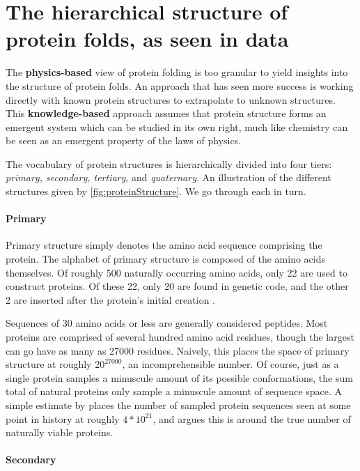 \documentclass{article}
\begin{document}
\section{The hierarchical structure of protein folds, as seen in data}
The \textbf{physics-based} view of protein folding is too granular to yield insights into the structure of protein folds. An approach that has seen more success is working directly with known protein structures to extrapolate to unknown structures. This \textbf{knowledge-based} approach assumes that protein structure forms an emergent system which can be studied in its own right, much like chemistry can be seen as an emergent property of the laws of physics.

The vocabulary of protein structures is hierarchically divided into four tiers: \textit{primary, secondary, tertiary}, and \textit{quaternary}. An illustration of the different structures given by \autoref{fig:proteinStructure}. We go through each in turn.

\paragraph{Primary} Primary structure simply denotes the amino acid sequence comprising the protein. The alphabet of primary structure is composed of the amino acids themselves. Of roughly 500 naturally occurring amino acids, only 22 are used to construct proteins. Of these 22, only 20 are found in genetic code, and the other 2 are inserted after the protein's initial creation \cite{20proteins}.

Sequences of 30 amino acids or less are generally considered peptides. Most proteins are comprised of several hundred amino acid residues, though the largest can go have as many as 27000 residues. Naively, this places the space of primary structure at roughly $20^{27000}$, an incomprehensible number. Of course, just as a single protein samples a minuscule amount of its possible conformations, the sum total of natural proteins only sample a minuscule amount of sequence space. A simple estimate by \cite{sequenceExploration} places the number of sampled protein sequences seen at some point in history at roughly $4 * 10^{21}$, and argues this is around the true number of naturally viable proteins.

\paragraph{Secondary}
\end{document}
